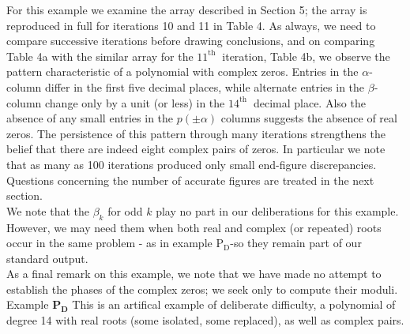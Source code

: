 \documentclass[10pt]{article}
\begin{document}
For this example we examine the array described in Section 5; the array is reproduced in full for iterations 10 and 11 in Table 4. As always, we need to compare successive iterations before drawing conclusions, and on comparing Table 4a with the similar array for the $11^{\text {th }}$ iteration, Table 4b, we observe the pattern characteristic of a polynomial with complex zeros. Entries in the $\alpha$-column differ in the first five decimal places, while alternate entries in the $\beta$-column change only by a unit (or less) in the $14^{\text {th }}$ decimal place. Also the absence of any small entries in the $p( \pm \alpha)$ columns suggests the absence of real zeros. The persistence of this pattern through many iterations strengthens the belief that there are indeed eight complex pairs of zeros. In particular we note that as many as 100 iterations produced only small end-figure discrepancies.\\
Questions concerning the number of accurate figures are treated in the next section.\\
We note that the $\beta_{k}$ for odd $k$ play no part in our deliberations for this example. However, we may need them when both real and complex (or repeated) roots occur in the same problem - as in example $\mathrm{P}_{\mathrm{D}}$-so they remain part of our standard output.\\
As a final remark on this example, we note that we have made no attempt to establish the phases of the complex zeros; we seek only to compute their moduli.\\
Example $\mathbf{P}_{\boldsymbol{D}}$ This is an artifical example of deliberate difficulty, a polynomial of degree 14 with real roots (some isolated, some replaced), as well as complex pairs.
\end{document}
